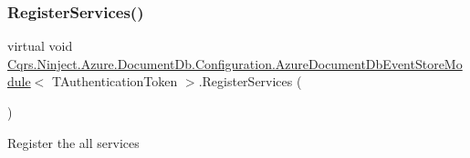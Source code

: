 \subsubsection{\texorpdfstring{Register\+Services()}{RegisterServices()}}
{\footnotesize\ttfamily virtual void \hyperlink{classCqrs_1_1Ninject_1_1Azure_1_1DocumentDb_1_1Configuration_1_1AzureDocumentDbEventStoreModule}{Cqrs.\+Ninject.\+Azure.\+Document\+Db.\+Configuration.\+Azure\+Document\+Db\+Event\+Store\+Module}$<$ T\+Authentication\+Token $>$.Register\+Services (\begin{DoxyParamCaption}{ }\end{DoxyParamCaption})\hspace{0.3cm}{\ttfamily [virtual]}}



Register the all services 

